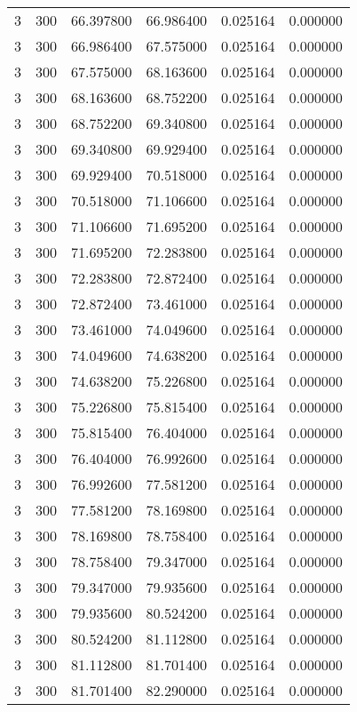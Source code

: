 \begin{longtable}{rrrrrr}
3 & 300 & 66.397800 & 66.986400 & 0.025164 & 0.000000 \\
3 & 300 & 66.986400 & 67.575000 & 0.025164 & 0.000000 \\
3 & 300 & 67.575000 & 68.163600 & 0.025164 & 0.000000 \\
3 & 300 & 68.163600 & 68.752200 & 0.025164 & 0.000000 \\
3 & 300 & 68.752200 & 69.340800 & 0.025164 & 0.000000 \\
3 & 300 & 69.340800 & 69.929400 & 0.025164 & 0.000000 \\
3 & 300 & 69.929400 & 70.518000 & 0.025164 & 0.000000 \\
3 & 300 & 70.518000 & 71.106600 & 0.025164 & 0.000000 \\
3 & 300 & 71.106600 & 71.695200 & 0.025164 & 0.000000 \\
3 & 300 & 71.695200 & 72.283800 & 0.025164 & 0.000000 \\
3 & 300 & 72.283800 & 72.872400 & 0.025164 & 0.000000 \\
3 & 300 & 72.872400 & 73.461000 & 0.025164 & 0.000000 \\
3 & 300 & 73.461000 & 74.049600 & 0.025164 & 0.000000 \\
3 & 300 & 74.049600 & 74.638200 & 0.025164 & 0.000000 \\
3 & 300 & 74.638200 & 75.226800 & 0.025164 & 0.000000 \\
3 & 300 & 75.226800 & 75.815400 & 0.025164 & 0.000000 \\
3 & 300 & 75.815400 & 76.404000 & 0.025164 & 0.000000 \\
3 & 300 & 76.404000 & 76.992600 & 0.025164 & 0.000000 \\
3 & 300 & 76.992600 & 77.581200 & 0.025164 & 0.000000 \\
3 & 300 & 77.581200 & 78.169800 & 0.025164 & 0.000000 \\
3 & 300 & 78.169800 & 78.758400 & 0.025164 & 0.000000 \\
3 & 300 & 78.758400 & 79.347000 & 0.025164 & 0.000000 \\
3 & 300 & 79.347000 & 79.935600 & 0.025164 & 0.000000 \\
3 & 300 & 79.935600 & 80.524200 & 0.025164 & 0.000000 \\
3 & 300 & 80.524200 & 81.112800 & 0.025164 & 0.000000 \\
3 & 300 & 81.112800 & 81.701400 & 0.025164 & 0.000000 \\
3 & 300 & 81.701400 & 82.290000 & 0.025164 & 0.000000 \\

\end{longtable}
